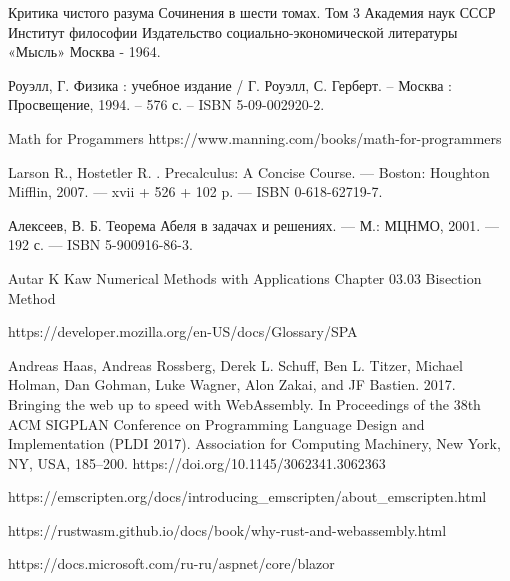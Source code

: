 \begingroup
\renewcommand{\section}[2]{\Anonchapter{Список использованных источников}\vspace{-1em}}
\begin{thebibliography}{00}

    Критика чистого разума
    Сочинения в шести томах.
    Том 3
    Академия наук СССР
    Институт философии
    Издательство социально-экономической литературы
    «Мысль»
    Москва - 1964. \TODO

    Роуэлл, Г. Физика : учебное издание / Г. Роуэлл, С. Герберт. -- Москва : Просвещение, 1994. -- 576 с. -- ISBN 5-09-002920-2.

    Math for Progammers \TODO
    https://www.manning.com/books/math-for-programmers

    Larson R., Hostetler R. . Precalculus: A Concise Course. — Boston:
    Houghton Mifflin, 2007. — xvii + 526 + 102 p. — ISBN 0-618-62719-7. \TODO

    Алексеев, В. Б. Теорема Абеля в задачах и решениях. — М.: МЦНМО, 2001. — 192 с. — ISBN 5-900916-86-3. \TODO

    \TODO Autar K Kaw Numerical Methods with Applications Chapter 03.03 Bisection Method

    https://developer.mozilla.org/en-US/docs/Glossary/SPA \TODO

    Andreas Haas, Andreas Rossberg, Derek L. Schuff, Ben L. Titzer, Michael Holman, Dan Gohman, Luke Wagner, Alon Zakai, and JF Bastien. 
    2017. Bringing the web up to speed with WebAssembly. 
    In Proceedings of the 38th ACM SIGPLAN Conference on Programming Language Design and Implementation (PLDI 2017). 
    Association for Computing Machinery, New York, NY, USA, 185–200. https://doi.org/10.1145/3062341.3062363 \TODO

    https://emscripten.org/docs/introducing\_emscripten/about\_emscripten.html \TODO

    https://rustwasm.github.io/docs/book/why-rust-and-webassembly.html \TODO

    https://docs.microsoft.com/ru-ru/aspnet/core/blazor \TODO


\end{thebibliography}
